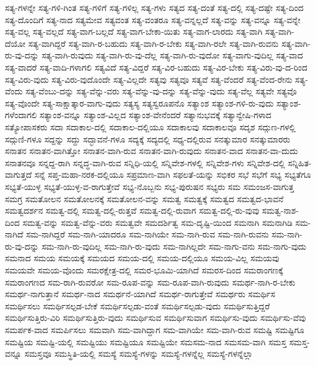 {ಸತ್ಯ-ಗಳನ್ನೇ
ಸತ್ಯ-ಗಳಿ-ಗಿಂತ
ಸತ್ಯ-ಗಳಿಗೆ
ಸತ್ಯ-ಗಳಿಲ್ಲ
ಸತ್ಯ-ಗಳು
ಸತ್ಯದ
ಸತ್ಯ-ದಂತೆ
ಸತ್ಯ-ದಲ್ಲಿ
ಸತ್ಯ-ದಷ್ಟೇ
ಸತ್ಯ-ದಿಂದ
ಸತ್ಯ-ದೊಂದಿಗೆ
ಸತ್ಯ-ನಾದ
ಸತ್ಯಮೇವ
ಸತ್ಯವಂತ
ಸತ್ಯ-ವಂತರೂ
ಸತ್ಯ-ವನ್ನಲ್ಲದೆ
ಸತ್ಯ-ವನ್ನು
ಸತ್ಯ-ವನ್ನೂ
ಸತ್ಯ-ವನ್ನೇ
ಸತ್ಯ-ವಲ್ಲ
ಸತ್ಯ-ವಲ್ಲದೆ
ಸತ್ಯ-ವಾಗ-ಬಲ್ಲದೆ
ಸತ್ಯ-ವಾಗ-ಬೇಕಾ-ಯಿತು
ಸತ್ಯ-ವಾಗ-ಲಾರದು
ಸತ್ಯ-ವಾಗಿ
ಸತ್ಯ-ವಾಗಿ-ದೆಯೋ
ಸತ್ಯ-ವಾಗಿದ್ದರೆ
ಸತ್ಯ-ವಾಗಿ-ರ-ಬಹುದು
ಸತ್ಯ-ವಾಗಿ-ರ-ಬೇಕು
ಸತ್ಯ-ವಾಗಿ-ರಲೇ
ಸತ್ಯ-ವಾಗಿ-ರುವನು
ಸತ್ಯ-ವಾಗಿ-ರು-ವು-ದನ್ನು
ಸತ್ಯ-ವಾಗಿ-ರುವುದು
ಸತ್ಯ-ವಾಗಿ-ರು-ವು-ದೆಲ್ಲ
ಸತ್ಯ-ವಾಗಿ-ರು-ವುದೋ
ಸತ್ಯ-ವಾಗು-ವುದಿಲ್ಲ
ಸತ್ಯ-ವಾದ
ಸತ್ಯ-ವಾದರೆ
ಸತ್ಯ-ವಾದಿ-ಗಳಾಗಲಿ
ಸತ್ಯವಿದೆ
ಸತ್ಯ-ವಿದ್ದರೆ
ಸತ್ಯ-ವಿರ-ಬಹುದು
ಸತ್ಯ-ವಿರ-ಬೇಕು
ಸತ್ಯ-ವಿರು-ವು-ದ-ರಿಂದ
ಸತ್ಯ-ವಿರು-ವುದು
ಸತ್ಯ-ವಿರು-ವುದೊಂದೇ
ಸತ್ಯ-ವಿಲ್ಲದೇ
ಸತ್ಯವು
ಸತ್ಯವೂ
ಸತ್ಯವೆ
ಸತ್ಯ-ವೆಂದರೆ
ಸತ್ಯ-ವೆಂದ-ರೇನು
ಸತ್ಯ-ವೆಂದು
ಸತ್ಯ-ವೆಂಬು-ದನ್ನು
ಸತ್ಯ-ವೆನ್ನು-ವರು
ಸತ್ಯ-ವೆನ್ನು-ವು-ದನ್ನು
ಸತ್ಯ-ವೆನ್ನು-ವುದು
ಸತ್ಯ-ವೆಲ್ಲ
ಸತ್ಯವೇ
ಸತ್ಯವೊ
ಸತ್ಯ-ವೊಂದೇ
ಸತ್ಯ-ಸಾಕ್ಷಾತ್ಕಾರ-ವಾಗು-ವುದು
ಸತ್ಯಸ್ಯ
ಸತ್ಯಸ್ವರೂಪನೊ
ಸತ್ಯಾಂಶ
ಸತ್ಯಾಂಶ-ಗಳಿ-ರು-ವುದು
ಸತ್ಯಾಂಶ-ಗಳೆಂದಾಗಲಿ
ಸತ್ಯಾಂಶ-ವನ್ನೂ
ಸತ್ಯಾಂಶ-ವಿಲ್ಲದ
ಸತ್ಯಾಂಶ-ವೇನೆಂದರೆ
ಸತ್ಯಾನುಭವಕ್ಕೆ
ಸತ್ಯಾನ್ವೇಷಿ-ಗಳಾದ
ಸತ್ಯೋಪಾಸಕರು
ಸದಾ
ಸದಾಕಾಲ-ದಲ್ಲಿ
ಸದಾಕಾಲ-ದಲ್ಲಿಯೂ
ಸದಾಕಾಲವು
ಸದಾಕಾಲವೂ
ಸದೃಶ
ಸದ್ಗುಣ-ಗಳಲ್ಲಿ
ಸದ್ಗುಣಿ-ಗಳೂ
ಸದ್ದನ್ನು
ಸದ್ದು
ಸದ್ಭಾವನೆ-ಗಳೂ
ಸದ್ಯಕ್ಕೆ
ಸದ್ಯದಲ್ಲಿ
ಸಧ್ಯ-ದಲ್ಲಿರುವ
ಸನತ್ಕುಮಾರ
ಸನತ್ಕುಮಾರರು
ಸನಾತನ
ಸನಾತನ-ವಾಗಿತ್ತೋ
ಸನಾತನ-ವಾಗಿ-ರುವ
ಸನಾತನ-ವಾಗಿ-ರುವುದು
ಸನಾತನ-ವಾದ
ಸನಾತನ-ವಾ-ದುದು
ಸನಾತನವೂ
ಸನ್ನದ್ದ-ರಾಗಿ
ಸನ್ನದ್ಧ-ವಾಗಿ-ರುವ
ಸನ್ನಿಧಿ-ಯಲ್ಲಿ
ಸನ್ನಿವೇಶ-ಗಳಲ್ಲಿ
ಸನ್ನಿವೇಶ-ಗಳು
ಸನ್ನಿವೇಶ-ದಲ್ಲಿ
ಸನ್ನಿಹಿತ-ವಾಗುತ್ತದೆ
ಸನ್ನೆ
ಸಪ್ತ-ಮಹಾ-ನರಕ-ದಲ್ಲಿಯೂ
ಸಪ್ರಮಾಣ-ವಾಗಿ
ಸಫಲತೆ-ಯನ್ನು
ಸಭಿಕರ
ಸಭೆ
ಸಭೆಗೆ
ಸಭ್ಯ
ಸಭ್ಯತೆಗೂ
ಸಭ್ಯತೆ-ಯುಳ್ಳ
ಸಭ್ಯತೆ-ಯುಳ್ಳ-ವ-ರಾಗುತ್ತೇವೆ
ಸಭ್ಯ-ನೊಬ್ಬನು
ಸಭ್ಯ-ಪುರುಷನ
ಸಭ್ಯರು
ಸಮ
ಸಮಂಜಸ-ವಾಗುತ್ತ
ಸಮಗ್ರ
ಸಮತೋಲನ
ಸಮತೋಲನಕ್ಕೆ
ಸಮತೋಲನ-ವನ್ನು
ಸಮತ್ವ
ಸಮತ್ವಕ್ಕೆ
ಸಮತ್ವದ
ಸಮತ್ವದ-ಭಾವನೆ
ಸಮತ್ವದರ್ಶನ
ಸಮತ್ವ-ದಲ್ಲಿ
ಸಮತ್ವ-ದಲ್ಲಿ-ರುತ್ತವೆ
ಸಮತ್ವ-ದಲ್ಲಿ-ರುವಾಗ
ಸಮತ್ವ-ದಲ್ಲಿ-ರು-ವುವು
ಸಮತ್ವ-ನಾಶ-ದಿಂದ
ಸಮತ್ವ-ವನ್ನು
ಸಮತ್ವ-ವೆನ್ನು-ವರು
ಸಮತ್ವವೇ
ಸಮದರ್ಶಿತ್ವ
ಸಮ-ದೃಷ್ಟಿ-ಯಿಂದ
ಸಮನಾಗಿ
ಸಮನಾಗಿಡಿ
ಸಮ-ನಾಗಿದೆ
ಸಮ-ನಾಗಿದ್ದರೆ
ಸಮ-ನಾಗಿ-ಯಾದರೂ
ಸಮ-ನಾಗಿಯೇ
ಸಮ-ನಾಗಿ-ರುವ
ಸಮ-ನಾಗಿ-ರುವನು
ಸಮ-ನಾಗಿ-ರು-ವು-ದನ್ನು
ಸಮ-ನಾಗಿ-ರು-ವುದಿಲ್ಲ
ಸಮ-ನಾಗಿ-ರು-ವುದು
ಸಮ-ನಾಗಿಲ್ಲದೇ
ಸಮ-ನಾಗು-ವನು
ಸಮ-ನಾಗು-ವುದು
ಸಮನಾದ
ಸಮಯ
ಸಮಯಕ್ಕೆ
ಸಮಯದ
ಸಮಯ-ದಲ್ಲಿ
ಸಮಯ-ದಲ್ಲಿಯೂ
ಸಮಯ-ವಿಲ್ಲ
ಸಮಯವು
ಸಮಯವೇ
ಸಮಯ-ವೊಂದು
ಸಮರಕ್ಷೇತ್ರ-ದಲ್ಲಿ
ಸಮರ-ಭೂಮಿ-ಯಾಗಿದೆ
ಸಮರಸ-ದಿಂದ
ಸಮರಾಂಗಣಕ್ಕೆ
ಸಮರಾಂಗಣದ
ಸಮ-ರಾಗಿ-ರುವರೋ
ಸಮ-ರೂಪ-ವನ್ನು
ಸಮ-ರೂಪ-ವಾಗಿ-ರುವುದು
ಸಮರ್ಥ-ನಾಗಿ-ರ-ಬೇಕು
ಸಮರ್ಥ-ನಾಗುತ್ತಾನೆ
ಸಮರ್ಥ-ನಾದ
ಸಮರ್ಥನೆ-ಯಾಗಿದೆ
ಸಮರ್ಥ-ರಾಗುತ್ತೇವೆ
ಸಮರ್ಥರು
ಸಮರ್ಥಿಸ
ಸಮರ್ಥಿಸಲು
ಸಮರ್ಥಿಸಲ್ಪಡ-ಬೇಕೆ
ಸಮರ್ಥಿಸಲ್ಪಡು-ವಂತೆ
ಸಮರ್ಥಿಸಲ್ಪಡು-ವುದು
ಸಮರ್ಥಿಸುತ್ತಿದ್ದರೆ
ಸಮರ್ಥಿಸುತ್ತಿರು-ವಿರಿ
ಸಮರ್ಥಿಸುತ್ತಿರು-ವುದು
ಸಮರ್ಥಿಸುವ
ಸಮರ್ಥಿಸುವಾಗ
ಸಮರ್ಥಿಸು-ವುದು
ಸಮರ್ಥಿಸು-ವೆವು
ಸಮರ್ಪಕ-ವಾದ
ಸಮರ್ಪಿಸಲು
ಸಮವಾಗಿ
ಸಮ-ವಾಗಿದ್ದಾಗ
ಸಮ-ವಾಗಿಯೇ
ಸಮ-ವಾಗಿ-ರುವ
ಸಮಷ್ಟಿ
ಸಮಷ್ಟಿಗೂ
ಸಮಷ್ಟಿಯ
ಸಮಷ್ಟಿ-ಯಲ್ಲಿ
ಸಮಷ್ಟಿಯು
ಸಮಷ್ಟಿಯೂ
ಸಮಷ್ಟಿಯೇ
ಸಮಸಮ-ನಾದ
ಸಮಸಮ-ವಾಗಿ
ಸಮಸ್ತ
ಸಮಸ್ತ-ವನ್ನೂ
ಸಮಸ್ತವೂ
ಸಮಸ್ಥಿತಿ-ಯಲ್ಲಿ
ಸಮಸ್ಯೆ
ಸಮಸ್ಯೆ-ಗಳನ್ನು
ಸಮಸ್ಯೆ-ಗಳನ್ನೆಲ್ಲ
ಸಮಸ್ಯೆ-ಗಳನ್ನೆಲ್ಲಾ
}
